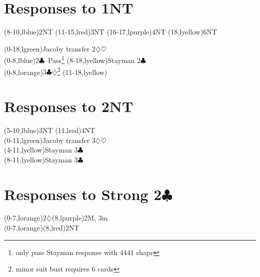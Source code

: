 \documentclass{article}
\def\C{$\clubsuit$}
\def\D{$\diamondsuit$}
\def\H{$\heartsuit$}
\begin{document}
\section{Responses to 1NT}
\begin{ptable}
  \bid(8-10,lblue){2NT}
  \bid(11-15,lred){3NT}
  \bid(16-17,lpurple){4NT}
  \bid(18,lyellow){6NT}\\
\iffalse %
  \bid(0-10,lgreen){Jacoby transfer 2\D\H}
  \bid(11-15,lblue){Texas transfer 4\D\H}
  \bid(16-18,lgreen){2\D\H}\\
\else
  \bid(0-18,lgreen){Jacoby transfer 2\D\H}\\
\fi
{}
  \bid(0-8,lblue){2\C--Pass\footnote{only pass Stayman response with 4441 shape}}
  \bid*(8-18,lyellow){Stayman 2\C}\\
  \bid(0-8,lorange){3\C\D\footnote{minor suit bust requires 6 cards}}
  \bid(11-18,lyellow){\cdrop[-.45pc]{Stayman 2\C}}\\
\end{ptable}

\section{Responses to 2NT}
\begin{ptable}
  \bid(5-10,lblue){3NT}
  \bid(11,lred){4NT}\\
  \bid(0-11,lgreen){Jacoby transfer 3\D\H}\\
  \bid(4-11,lyellow){Stayman 3\C}\\
  \bid*(8-11,lyellow){Stayman 3\C}\\
\end{ptable}

\section{Responses to Strong 2\C}
\begin{ptable}
\bid*(0-7,lorange){2\D}\bid(8,lpurple){2M, 3m}\\
\bid(0-7,lorange){\cdrop[-.45pc]{2\D}}\bid(8,lred){2NT}\\
\end{ptable}
\end{document}
